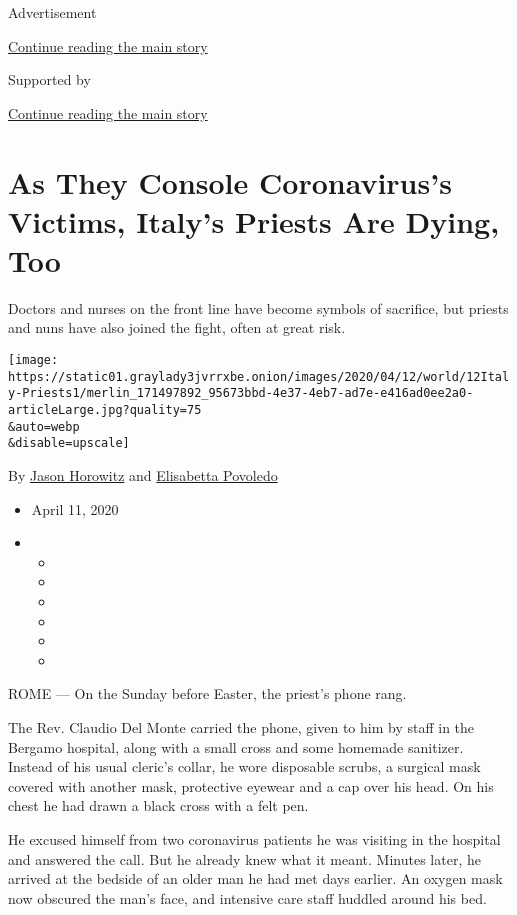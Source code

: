 Advertisement

\protect\hyperlink{after-top}{Continue reading the main story}

Supported by

\protect\hyperlink{after-sponsor}{Continue reading the main story}

\hypertarget{as-they-console-coronaviruss-victims-italys-priests-are-dying-too}{%
\section{As They Console Coronavirus's Victims, Italy's Priests Are
Dying,
Too}\label{as-they-console-coronaviruss-victims-italys-priests-are-dying-too}}

Doctors and nurses on the front line have become symbols of sacrifice,
but priests and nuns have also joined the fight, often at great risk.

\texttt{[image: https://static01.graylady3jvrrxbe.onion/images/2020/04/12/world/12Italy-Priests1/merlin\_171497892\_95673bbd-4e37-4eb7-ad7e-e416ad0ee2a0-articleLarge.jpg?quality=75\\\&auto=webp\\\&disable=upscale]}

By \href{https://www.nytimes3xbfgragh.onion/by/jason-horowitz}{Jason
Horowitz} and
\href{https://www.nytimes3xbfgragh.onion/by/elisabetta-povoledo}{Elisabetta
Povoledo}

\begin{itemize}
\item
  April 11, 2020
\item
  \begin{itemize}
  \item
  \item
  \item
  \item
  \item
  \item
  \end{itemize}
\end{itemize}

ROME --- On the Sunday before Easter, the priest's phone rang.

The Rev. Claudio Del Monte carried the phone, given to him by staff in
the Bergamo hospital, along with a small cross and some homemade
sanitizer. Instead of his usual cleric's collar, he wore disposable
scrubs, a surgical mask covered with another mask, protective eyewear
and a cap over his head. On his chest he had drawn a black cross with a
felt pen.

He excused himself from two coronavirus patients he was visiting in the
hospital and answered the call. But he already knew what it meant.
Minutes later, he arrived at the bedside of an older man he had met days
earlier. An oxygen mask now obscured the man's face, and intensive care
staff huddled around his bed.

